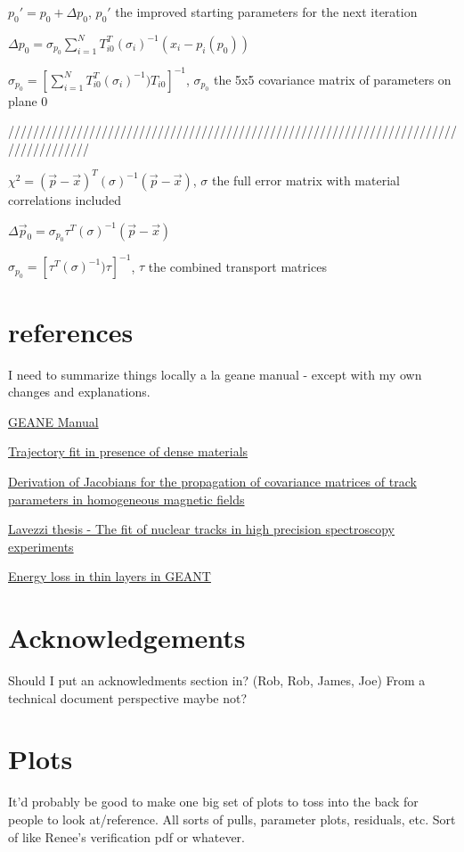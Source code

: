 \documentclass{article}
\begin{document}
$p_{0}' = p_{0} + \Delta p_{0}$, $p_{0}'$ the improved starting parameters for the next iteration

$\Delta p_{0} = \sigma_{p_{0}} \sum_{i=1}^{N} T^{T}_{i0}(\sigma_{i})^{-1}(x_{i} - p_{i}(p_{0}))$

$\sigma_{p_{0}} = [\sum_{i=1}^{N} T^{T}_{i0} (\sigma_{i})^{-1}) T_{i0} ]^{-1}$, $\sigma_{p_{0}}$ the 5x5 covariance matrix of parameters on plane 0

/////////////////////////////////////////////////////////////////////////////////////

$\chi^2 = (\vec{p}-\vec{x})^{T} (\sigma)^{-1} (\vec{p}-\vec{x})$, $\sigma$ the full error matrix with material correlations included

$\Delta \vec{p}_{0} = \sigma_{p_{0}} \tau^{T}(\sigma)^{-1}(\vec{p}-\vec{x})$

$\sigma_{p_{0}} = [\tau^{T} (\sigma)^{-1}) \tau ]^{-1}$, $\tau$ the combined transport matrices






\section{references}

  I need to summarize things locally a la geane manual - except with my own changes and explanations.

	\href{http://innocentonnice.web.cern.ch/innocentonnice/napoli99/geane_manual.ps}{GEANE Manual}

	\href{http://www.sciencedirect.com/science/article/pii/016890029390992Q}{Trajectory fit in presence of dense materials}

	\href{http://www.sciencedirect.com/science/article/pii/S0168900206013143}{Derivation of Jacobians for the propagation of covariance matrices of track parameters in homogeneous magnetic fields}

	\href{http://bamboo.pv.infn.it/doc/L_Lavezzi.pdf}{Lavezzi thesis - The fit of nuclear tracks in high precision spectroscopy experiments}

  \href{http://www.sciencedirect.com/science/article/pii/0168900295003444}{Energy loss in thin layers in GEANT}

\section{Acknowledgements}

Should I put an acknowledments section in? (Rob, Rob, James, Joe)
From a technical document perspective maybe not?

\section{Plots}

It'd probably be good to make one big set of plots to toss into the back for people to look at/reference. All sorts of pulls, parameter plots, residuals, etc. Sort of like Renee's verification pdf or whatever.
\end{document}
